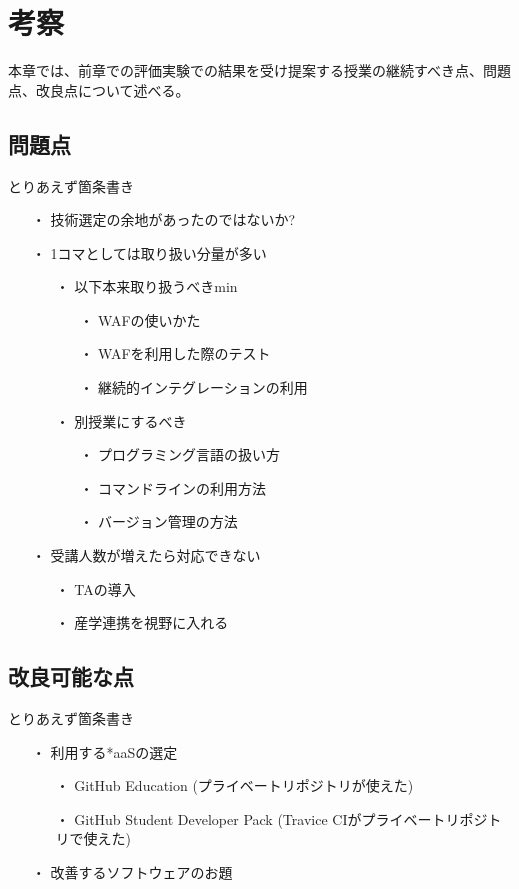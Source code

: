 \chapter{考察}

本章では、前章での評価実験での結果を受け提案する授業の継続すべき点、問題点、改良点について述べる。

\section{問題点}

とりあえず箇条書き

\begin{itemize}
  \item[・] 技術選定の余地があったのではないか?
  \item[・] 1コマとしては取り扱い分量が多い
    \begin{itemize}
    \item[・] 以下本来取り扱うべきmin
      \begin{itemize}
        \item[・] WAFの使いかた
        \item[・] WAFを利用した際のテスト
        \item[・] 継続的インテグレーションの利用
      \end{itemize}
    \item[・] 別授業にするべき
      \begin{itemize}
        \item[・] プログラミング言語の扱い方
        \item[・] コマンドラインの利用方法
        \item[・] バージョン管理の方法
      \end{itemize}
    \end{itemize}
  \item[・] 受講人数が増えたら対応できない
    \begin{itemize}
      \item[・] TAの導入
      \item[・] 産学連携を視野に入れる
    \end{itemize}
\end{itemize}

\section{改良可能な点}

とりあえず箇条書き

\begin{itemize}
\item[・] 利用する*aaSの選定
  \begin{itemize}
    \item[・] GitHub Education (プライベートリポジトリが使えた)
    \item[・] GitHub Student Developer Pack (Travice CIがプライベートリポジトリで使えた)
  \end{itemize}
\item[・] 改善するソフトウェアのお題
\end{itemize}
